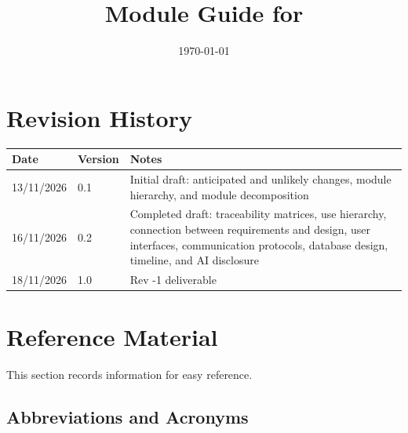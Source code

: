 \documentclass[12pt, titlepage]{article}
\begin{document}
\title{Module Guide for \progname{}} 
\author{\authname}
\date{\today}

\maketitle


\section{Revision History}

\begin{tabularx}{\textwidth}{p{2.4cm}p{1.8cm}>{\raggedright\arraybackslash}X}
\toprule {\bf Date} & {\bf Version} & {\bf Notes}\\
\midrule
13/11/2026 & 0.1 & Initial draft: anticipated and unlikely changes, module hierarchy, and module decomposition\\
16/11/2026 & 0.2 & Completed draft: traceability matrices, use hierarchy, connection between requirements and design, user interfaces, communication protocols, database design, timeline, and AI disclosure\\
18/11/2026 & 1.0 & Rev -1 deliverable\\
\bottomrule
\end{tabularx}

\newpage

\section{Reference Material}

This section records information for easy reference. 

\subsection{Abbreviations and Acronyms}
\end{document}
